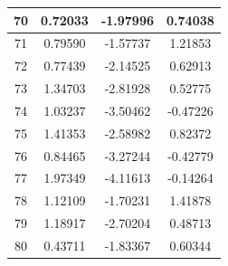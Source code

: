 \documentclass[14pt,a4paper]{scrartcl}
\begin{document}
\begin{table}[ht]
\begin{tabular}{|c||c||c||c|}
	\hline
	70 & 0.72033 & -1.97996 & 0.74038 \\ 
	\hline
	71 & 0.79590 & -1.57737 & 1.21853 \\ 
	\hline
	72 & 0.77439 & -2.14525 & 0.62913 \\ 
	\hline
	73 & 1.34703 & -2.81928 & 0.52775 \\ 
	\hline
	74 & 1.03237 & -3.50462 & -0.47226 \\ 
	\hline
	75 & 1.41353 & -2.58982 & 0.82372 \\ 
	\hline
	76 & 0.84465 & -3.27244 & -0.42779 \\ 
	\hline
	77 & 1.97349 & -4.11613 & -0.14264 \\ 
	\hline
	78 & 1.12109 & -1.70231 & 1.41878 \\ 
	\hline
	79 & 1.18917 & -2.70204 & 0.48713 \\ 
	\hline
	80 & 0.43711 & -1.83367 & 0.60344 \\ 		
	\end{tabular}
\end{table}
\end{document}
